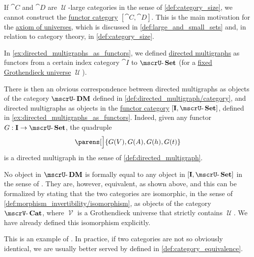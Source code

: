 \begin{remark}\label{rem:functor_category_size}
  If \( \cat{C} \) and \( \cat{D} \) are \( \mscrU \)-large categories in the sense of \cref{def:category_size}, we cannot construct the \hyperref[def:functor_category]{functor category} \( [\cat{C}, \cat{D}] \). This is the main motivation for the \hyperref[def:axiom_of_universes]{axiom of universes}, which is discussed in \cref{def:large_and_small_sets} and, in relation to category theory, in \cref{def:category_size}.
\end{remark}

\begin{example}\label{ex:isomorphism_of_directed_multigraph_categories}
  In \cref{ex:directed_multigraphs_as_functors}, we defined \hyperref[def:directed_multigraph]{directed multigraphs} as functors from a certain index category \( \cat{I} \) to \( \ucat{Set} \) (for a \hyperref[def:category_size]{fixed Grothendieck universe} \( \mscrU \)).

  There is then an obvious correspondence between directed multigraphs as objects of the category \( \ucat{DM} \) defined in \cref{def:directed_multigraph/category}, and directed multigraphs as objects in the \hyperref[def:functor_category]{functor category} \( [\cat{I}, \ucat{Set}] \), defined in \cref{ex:directed_multigraphs_as_functors}. Indeed, given any functor \( G: \cat{I} \to \ucat{Set} \), the quadruple
  \begin{equation*}
    \parens[\Big]{ G(V), G(A), G(h), G(t) }
  \end{equation*}
  is a directed multigraph in the sense of \cref{def:directed_multigraph}.

  No object in \( \ucat{DM} \) is formally equal to any object in \( [\cat{I}, \ucat{Set}] \) in the sense of \hyperref[def:zfc]{}. They are, however, equivalent, as shown above, and this can be formalized by stating that the two categories are isomorphic, in the sense of \cref{def:morphism_invertibility/isomorphism}, as objects of the category \( \ucat[\mscrV]{Cat} \), where \( \mscrV \) is a Grothendieck universe that strictly contains \( \mscrU \). We have already defined this isomorphism explicitly.

  This is an example of . In practice, if two categories are not so obviously identical, we are usually better served by  defined in \cref{def:category_equivalence}.
\end{example}

